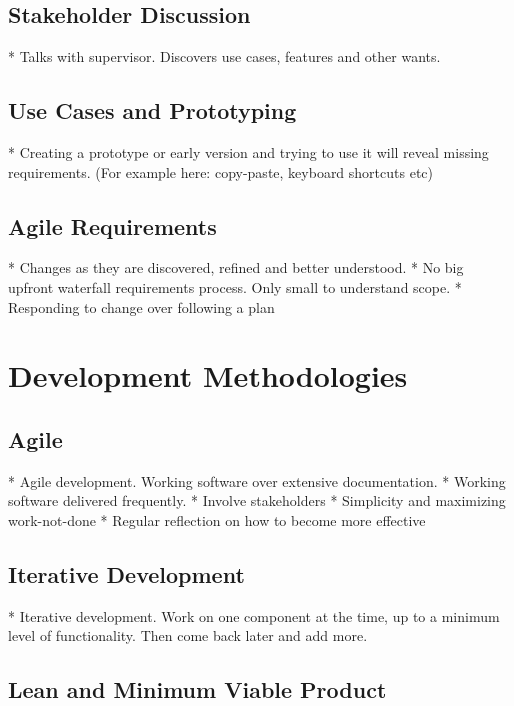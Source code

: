\subsection{Stakeholder Discussion}

* Talks with supervisor. Discovers use cases, features and other wants.

\subsection{Use Cases and Prototyping}

* Creating a prototype or early version and trying to use it will reveal missing requirements. (For example here: copy-paste, keyboard shortcuts etc)

\subsection{Agile Requirements}

* Changes as they are discovered, refined and better understood.
* No big upfront waterfall requirements process. Only small to understand scope.
* Responding to change over following a plan

\section{Development Methodologies}

\subsection{Agile}

* Agile development. Working software over extensive documentation.
* Working software delivered frequently.
* Involve stakeholders
* Simplicity and maximizing work-not-done 
* Regular reflection on how to become more effective

\subsection{Iterative Development}
* Iterative development. Work on one component at the time, up to a minimum level of functionality. Then come back later and add more.


\subsection{Lean and Minimum Viable Product}

